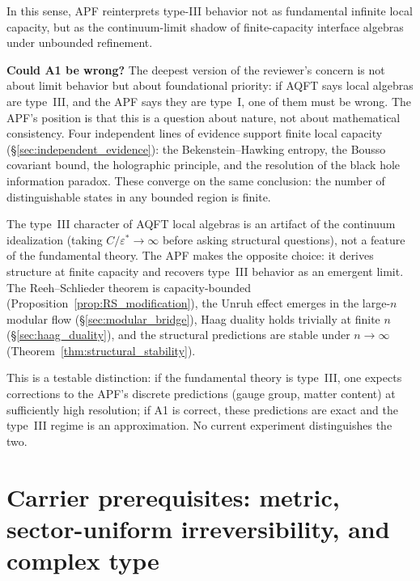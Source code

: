 \documentclass[11pt,a4paper]{article}
\theoremstyle{definition}
\newcommand{\eps}{\varepsilon}
\begin{document}
\smallskip\noindent In this sense, APF reinterprets type-III behavior
not as fundamental infinite local capacity, but as the continuum-limit
shadow of finite-capacity interface algebras under unbounded
refinement.


\smallskip\noindent\textbf{Could A1 be wrong?}\quad
The deepest version of the reviewer's concern is not about limit behavior
but about foundational priority: if AQFT says local algebras are type~III,
and the APF says they are type~I, one of them must be wrong.  The APF's
position is that this is a question about nature, not about mathematical
consistency.  Four independent lines of evidence support finite local
capacity (\S\ref{sec:independent_evidence}): the Bekenstein--Hawking
entropy, the Bousso covariant bound, the holographic principle, and the
resolution of the black hole information paradox.  These converge on
the same conclusion: the number of distinguishable states in any bounded
region is finite.

The type~III character of AQFT local algebras
is an artifact of the continuum idealization (taking $C/\eps^* \to
\infty$ before asking structural questions), not a feature of the
fundamental theory.  The APF makes the opposite choice: it derives
structure at finite capacity and recovers type~III behavior as an
emergent limit.  The Reeh--Schlieder theorem is capacity-bounded
(Proposition~\ref{prop:RS_modification}), the Unruh effect emerges
in the large-$n$ modular flow (\S\ref{sec:modular_bridge}), Haag
duality holds trivially at finite $n$ (\S\ref{sec:haag_duality}),
and the structural predictions are stable under $n \to \infty$
(Theorem~\ref{thm:structural_stability}).

This is a testable distinction: if the fundamental
theory is type~III, one expects corrections to the APF's discrete
predictions (gauge group, matter content) at sufficiently high
resolution; if A1 is correct, these predictions are exact and the
type~III regime is an approximation.  No current experiment distinguishes
the two.

\newpage


\section{Carrier prerequisites: metric, sector-uniform irreversibility, and complex type}
\label{sec:carrier_prereqs}
\end{document}
